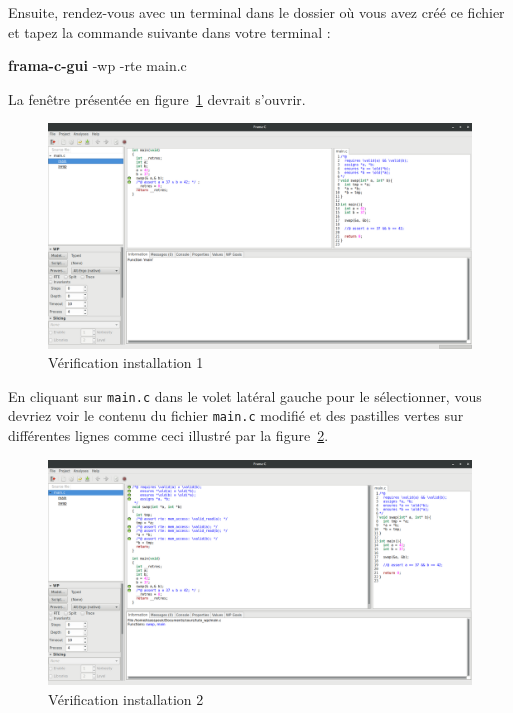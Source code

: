 \documentclass[12pt,francais,]{scrbook}
\newenvironment{Shaded}{}{}
\newcommand{\KeywordTok}[1]{\textcolor[rgb]{0.00,0.44,0.13}{\textbf{{#1}}}}
\newcommand{\NormalTok}[1]{{#1}}
\begin{document}
Ensuite, rendez-vous avec un terminal dans le dossier où vous avez créé
ce fichier et tapez la commande suivante dans votre terminal :

\begin{footnotesize}\begin{Shaded}
\begin{Highlighting}[]
\KeywordTok{frama-c-gui} \NormalTok{-wp -rte main.c}
\end{Highlighting}
\end{Shaded}\end{footnotesize}

La fenêtre présentée en figure~\ref{fig:install-1} devrait s'ouvrir.

\begin{figure}[htbp]
\centering
\includegraphics[scale=0.5]{1-2-verif_install-1.png}
\caption{Vérification installation 1}
\label{fig:install-1}
\end{figure}

En cliquant sur \texttt{main.c} dans le volet latéral gauche pour le
sélectionner, vous devriez voir le contenu du fichier \texttt{main.c}
modifié et des pastilles vertes sur différentes lignes comme ceci
illustré par la figure~\ref{fig:install-2}.

\begin{figure}[htbp]
\centering
\includegraphics[scale=0.5]{1-2-verif_install-2.png}
\caption{Vérification installation 2}
\label{fig:install-2}
\end{figure}
\end{document}
